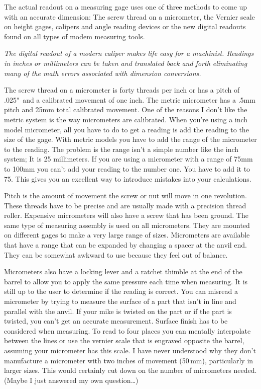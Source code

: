 
The actual readout on a measuring gage uses one of three methods to come up with
an accurate dimension: The screw thread on a micrometer, the Vernier scale on
height gages, calipers and angle reading devices or the new digital readouts
found on all types of modem measuring tools.

\bigskip
\textit{The digital readout of a modern caliper makes life easy for a machinist.
Readings in inches or millimeters can be taken and translated back and forth
eliminating many of the math errors associated with dimension conversions.}
\bigskip

The screw thread on a micrometer is forty threads per inch or has a pitch of
.025"\ and a calibrated movement of one inch. The metric micrometer has a .5mm
pitch and 25mm total calibrated movement. One of the reasons I don't like the
metric system is the way micrometers are calibrated. When you're using a inch
model micrometer, all you have to do to get a reading is add the reading to the
size of the gage. With metric models you have to add the range of the micrometer
to the reading. The problem is the range isn't a simple number like the inch
system; It is 25 millimeters. If you are using a micrometer with a range of 75mm
to 100mm you can't add your reading to the number one. You have to add it to 75.
This gives you an excellent way to introduce mistakes into your calculations.

Pitch is the amount of movement the screw or nut will move in one revolution.
These threads have to be precise and are usually made with a precision thread
roller. Expensive micrometers will also have a screw that has been
ground. The same type of measuring assembly is used on all micrometers. They are
mounted on different gages to make a very large range of sizes. Micrometers are
available that have a range that can be expanded by changing a spacer at the
anvil end. They can be somewhat awkward to use because they feel out of balance.


Micrometers also have a locking lever and a ratchet thimble at the end of the
barrel to allow you to apply the same pressure each time when measuring. It is
still up to the user to determine if the reading is correct. You can misread a
micrometer by trying to measure the surface of a part that isn't in line and
parallel with the anvil. If your mike is twisted on the part or if the part is
twisted, you can't get an accurate measurement. Surface finish has to be
considered when measuring. To read to four places you can mentally interpolate
between the lines or use the vernier scale that is engraved opposite the barrel,
assuming your micrometer has this scale. I have never understood why they don't
manufacture a micrometer with two inches of movement (50\,mm), particularly in
larger sizes. This would certainly cut down on the number of micrometers needed.
(Maybe I just answered my own question\ldots)

